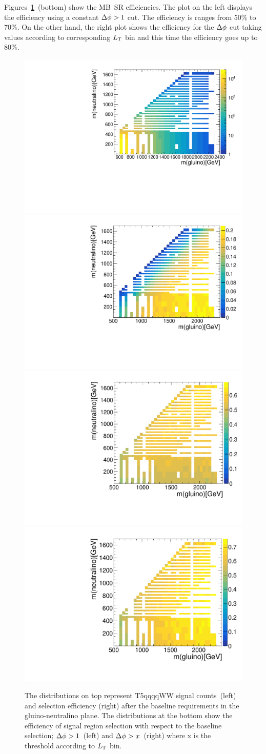 Figures~\ref{fig:signalEffs}~(bottom) show the MB~SR efficiencies. The plot on the left displays the efficiency using a constant $\Delta \phi>1$ cut. The efficiency is ranges from 50\% to 70\%. On the other hand, the right plot shows the efficiency for the $\Delta \phi$ cut taking values according to corresponding $L_{\rm T}$ bin and this time the efficiency goes up to 80\%.
\begin{figure}[!hbt]
    \begin{center}
 \includegraphics[width=0.45 \textwidth]{Plots/analysis/signalRegions/preselyields}
 \includegraphics[width=0.4 \textwidth]{Plots/analysis/signalRegions/preselEff}\\
 \includegraphics[width=0.4 \textwidth]{Plots/analysis/signalRegions/DF_Eff}
  \includegraphics[width=0.4 \textwidth]{Plots/analysis/signalRegions/DF_var_Eff}
  \caption{ \label{fig:signalEffs} The distributions on top represent T5qqqqWW signal counts~(left) and selection efficiency (right) after the baseline requirements in the gluino-neutralino plane. The distributions at the bottom show the efficiency of signal region selection with respect to the baseline selection; $\Delta \phi>1$~(left) and $\Delta \phi>x$~(right) where x is the threshold according to $L_{\rm T}$ bin.  
  }
   \end{center}
\end{figure}

